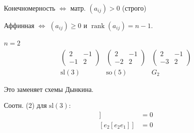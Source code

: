 Конечномерность $\Leftrightarrow$ матр. $(a_{ij})>0$ (строго)

Аффинная $\Leftrightarrow$ $(a_{ij})\ge0$ и $\operatorname{rank}(a_{ij})=n-1$.

\underline{$n=2$}
\[
\begin{array}{ccc}
\begin{pmatrix}2&-1\\-1&2\end{pmatrix}&
\begin{pmatrix}2&-1\\-2&2\end{pmatrix}&
\begin{pmatrix}2&-1\\-3&2\end{pmatrix}\\
\mathrm{sl}(3)&\mathrm{so}(5)&G_2
\end{array}
\]

Это заменяет схемы Дынкина.

Соотн. (2) для $\mathrm{sl}(3)$:
\begin{align*}
[e_1[e_1e_2]]&=0\\
[e_2[e_2e_1]]&=0
\end{align*}


